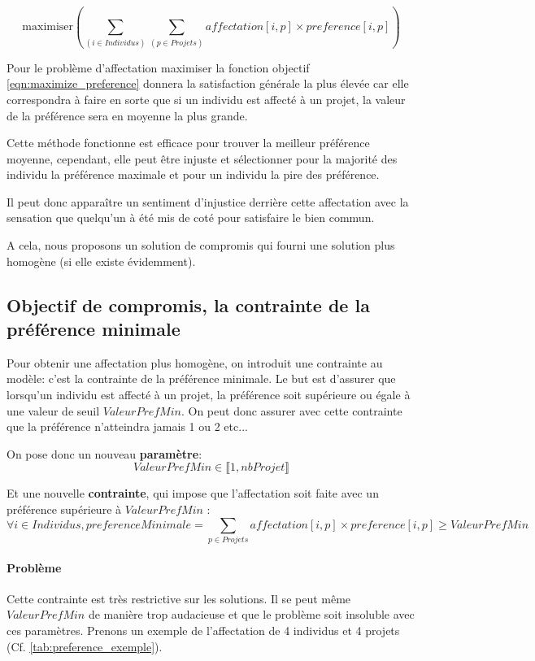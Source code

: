 \documentclass[final,poster]{polytech/polytech}
\begin{document}
\begin{equation}
\label{eqn:maximize_preference}
\text{maximiser} \left( \sum_{(i \in Individus)} \sum_{(p\in Projets)} affectation[i,p]\times preference[i,p] \right)
\end{equation}

Pour le problème d'affectation maximiser la fonction objectif \eqref{eqn:maximize_preference} donnera la satisfaction générale la plus élevée car elle correspondra à faire en sorte que si un individu est affecté à un projet, la valeur de la préférence sera en moyenne la plus grande.

Cette méthode fonctionne est efficace pour trouver la meilleur préférence moyenne, cependant, elle peut être injuste et sélectionner pour la majorité des individu la préférence maximale et pour un individu la pire des préférence.

Il peut donc apparaître un sentiment d'injustice derrière cette affectation avec la sensation que quelqu'un à été mis de coté pour satisfaire le bien commun.

A cela, nous proposons un solution de compromis qui fourni une solution plus homogène (si elle existe évidemment).

\subsection{Objectif de compromis, la contrainte de la préférence minimale}
\label{sec:pref_min}

Pour obtenir une affectation plus homogène, on introduit une contrainte au modèle: c'est la contrainte de la préférence minimale.
Le but est d'assurer que lorsqu'un individu est affecté à un projet, la préférence soit supérieure ou égale à une valeur de seuil $ValeurPrefMin$.
On peut donc assurer avec cette contrainte que la préférence n'atteindra jamais 1 ou 2 etc...

On pose donc un nouveau \textbf{paramètre}:
$$
ValeurPrefMin \in \llbracket 1,nbProjet \rrbracket
$$

Et une nouvelle \textbf{contrainte}, qui impose que l'affectation soit faite avec un préférence supérieure à $ValeurPrefMin$ :
$$
\forall i \in Individus ,preferenceMinimale = \sum_{p \in Projets} affectation[i,p]\times preference[i,p] \geqslant ValeurPrefMin
$$

\paragraph{Problème} Cette contrainte est très restrictive sur les solutions. Il se peut même $ValeurPrefMin$ de manière trop audacieuse et que le problème soit insoluble avec ces paramètres.
Prenons un exemple de l'affectation de 4 individus et 4 projets (Cf. \autoref{tab:preference_exemple}).
\end{document}
